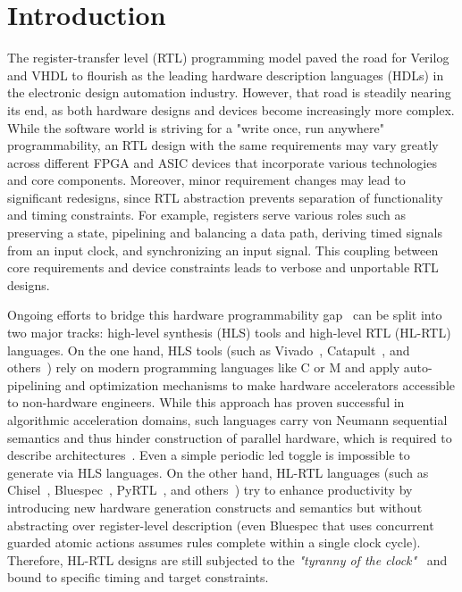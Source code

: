 \section{Introduction}
The register-transfer level (RTL) programming model paved the road for Verilog and VHDL to flourish as the leading hardware description languages (HDLs) in the electronic design automation industry. However, that road is steadily nearing its end, as both hardware designs and devices become increasingly more complex. While the software world is striving for a "write once, run anywhere" programmability, an RTL design with the same requirements may vary greatly across different FPGA and ASIC devices that incorporate various technologies and core components. Moreover, minor requirement changes may lead to significant redesigns, since RTL abstraction prevents separation of functionality and timing constraints. For example, registers serve various roles such as preserving a state, pipelining and balancing a data path, deriving timed signals from an input clock, and synchronizing an input signal. This coupling between core requirements and device constraints leads to verbose and unportable RTL designs. 

Ongoing efforts to bridge this hardware programmability gap~\cite{Kapre2016, Nane2016, Windh2015} can be split into two major tracks: high-level synthesis (HLS) tools and high-level RTL (HL-RTL) languages.
On the one hand, HLS tools (such as Vivado~\cite{Vivado2012}, Catapult~\cite{graphics2008catapult}, and others~\cite{Kavvadias2013, synphony2015}) rely on modern programming languages like C or M and apply  auto-pipelining and optimization mechanisms to make hardware accelerators accessible to non-hardware engineers. While this approach has proven successful in algorithmic acceleration domains, such languages carry von Neumann sequential semantics and thus hinder construction of parallel hardware, which is required to describe architectures~\cite{Zhao2017}. Even a simple periodic led toggle is impossible to generate via HLS languages.
On the other hand, HL-RTL languages (such as Chisel~\cite{Bachrach2012}, Bluespec~\cite{nikhil2004bluespec}, PyRTL~\cite{Clow2017}, and others~\cite{Charles2016, Liu2017, jiang2018mamba, decaluwe2004myhdl, CxLang2014, Lockhart2014}) try to enhance productivity by introducing new hardware generation constructs and semantics but without abstracting over register-level description (even Bluespec that uses concurrent guarded atomic actions assumes rules complete within a single clock cycle). Therefore, HL-RTL designs are still subjected to the \emph{"tyranny of the clock"}~\cite{Sutherland2012} and bound to specific timing and target constraints.

